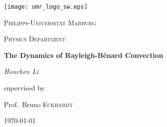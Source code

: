 \begin{titlepage}
	\centering
	\texttt{[image: umr\_logo\_sw.eps]}\par\vspace{1cm}
	{\scshape\LARGE Philipps-Universit\"at Marburg\par}
	\vspace{1cm}
	{\scshape\Large Physics Department\par}
	\vspace{1.5cm}
	{\huge\bfseries The Dynamics of Rayleigh-B\'enard Convection\par}
	\vspace{2cm}
	{\Large\itshape Houchen Li\par}
	\vfill
	supervised by\par
	Prof.~Bruno \textsc{Eckhardt}
		
	\vfill

	{\large \today\par}


\end{titlepage}
